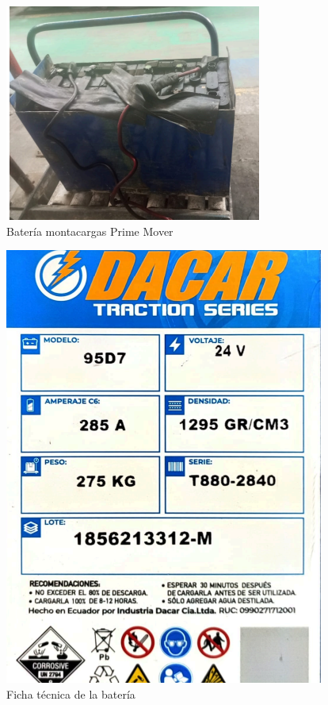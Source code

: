 \documentclass[11pt]{article}
\begin{document}
    \begin{figure}[htbp]
        \centering
        \includegraphics[width=0.4\linewidth]{img/Anexo4.png}
        \caption{Batería montacargas Prime Mover}
    \end{figure}

    \begin{figure}[htbp]
        \centering
        \includegraphics[width=0.3\linewidth]{img/Anexo5.png}
        \caption{Ficha técnica de la batería}
    \end{figure}
\end{document}
